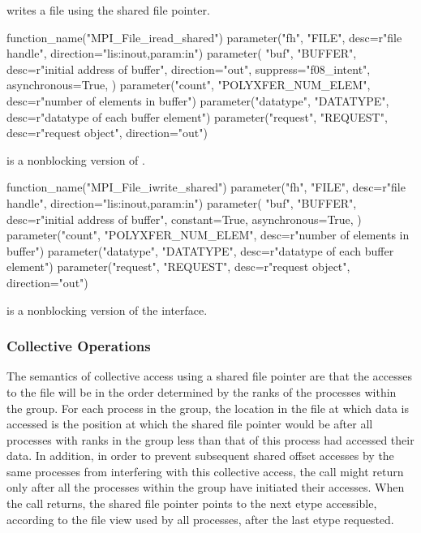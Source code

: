  writes a file
using the shared file pointer.

%
%
\begin{mpi-binding}
    function_name("MPI_File_iread_shared")
    parameter("fh", "FILE", desc=r"file handle", direction="lis:inout,param:in")
    parameter(
        "buf",
        "BUFFER",
        desc=r"initial address of buffer",
        direction="out",
        suppress="f08_intent",
        asynchronous=True,
    )
    parameter("count", "POLYXFER_NUM_ELEM", desc=r"number of elements in buffer")
    parameter("datatype", "DATATYPE", desc=r"datatype of each buffer element")
    parameter("request", "REQUEST", desc=r"request object", direction="out")
\end{mpi-binding}

 is a nonblocking version
of .
 
%
%
\begin{mpi-binding}
    function_name("MPI_File_iwrite_shared")
    parameter("fh", "FILE", desc=r"file handle", direction="lis:inout,param:in")
    parameter(
        "buf",
        "BUFFER",
        desc=r"initial address of buffer",
        constant=True,
        asynchronous=True,
    )
    parameter("count", "POLYXFER_NUM_ELEM", desc=r"number of elements in buffer")
    parameter("datatype", "DATATYPE", desc=r"datatype of each buffer element")
    parameter("request", "REQUEST", desc=r"request object", direction="out")
\end{mpi-binding}

 is a nonblocking version
of the  interface.

\subsubsection{Collective Operations}
\label{sec:io-shared-ptr-col}

The semantics of collective access using a shared file pointer are
that the accesses to the file will be
in the order determined by the ranks of the processes
within the group.
For each process in the group, the location in the file at which data is accessed is the 
position at which the shared file pointer would be after all processes with 
ranks in the group less than that of this process had accessed their data.
In addition, in order to prevent subsequent
shared offset accesses by the same processes from interfering
with this collective 
access, the call might return only after all the processes 
within the group have initiated their 
accesses.
When the call returns, the shared file pointer points
to the next etype accessible,
according to the file view used by all processes,
after the last etype requested.

